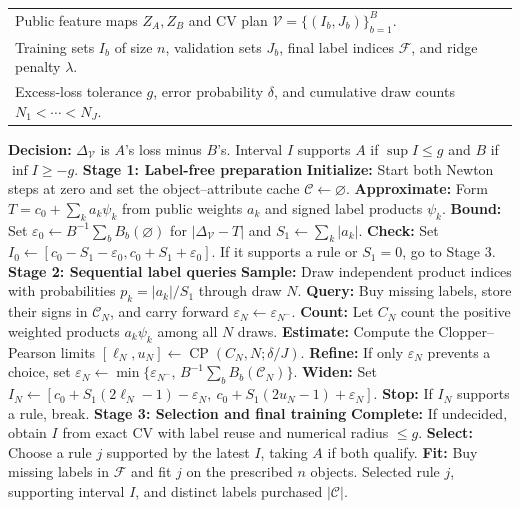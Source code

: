 \begin{algorithm}[H]
\caption{Label-Efficient Comparison (LEC) for a Fixed CV Plan}\label{alg:full}
\small
\renewcommand{\algorithmicrequire}{\textbf{Input:}}
\renewcommand{\algorithmicensure}{\textbf{Output:}}
\begin{algorithmic}[1]
\Require \begin{tabular}[t]{@{}l@{}}
Public feature maps $Z_A,Z_B$ and CV plan $\mathcal V=\{(I_b,J_b)\}_{b=1}^B$.\\
Training sets $I_b$ of size $n$, validation sets $J_b$, final label indices $\mathcal F$, and ridge penalty $\lambda$.\\
Excess-loss tolerance $g$, error probability $\delta$, and cumulative draw counts $N_1<\cdots<N_J$.
\end{tabular}
\Statex\textbf{Decision:} $\Delta_{\mathcal V}$ is $A$'s loss minus $B$'s. Interval $I$ supports $A$ if $\sup I\le g$ and $B$ if $\inf I\ge-g$.
\Statex\textbf{Stage 1: Label-free preparation}
\State \textbf{Initialize:} Start both Newton steps at zero and set the object--attribute cache $\mathcal C\gets\varnothing$.
\State \textbf{Approximate:} Form $T=c_0+\sum_k a_k\psi_k$ from public weights $a_k$ and signed label products $\psi_k$.
\State \textbf{Bound:} Set $\varepsilon_0\gets B^{-1}\sum_b B_b(\varnothing)$ for $|\Delta_{\mathcal V}-T|$ and $S_1\gets\sum_k|a_k|$.
\State \textbf{Check:} Set $I_0\gets[c_0-S_1-\varepsilon_0,c_0+S_1+\varepsilon_0]$. If it supports a rule or $S_1=0$, go to Stage 3.
\Statex\textbf{Stage 2: Sequential label queries}
  \State \textbf{Sample:} Draw independent product indices with probabilities $p_k=|a_k|/S_1$ through draw $N$.
  \State \textbf{Query:} Buy missing labels, store their signs in $\mathcal C_N$, and carry forward $\varepsilon_N\gets\varepsilon_{N^-}$.
  \State \textbf{Count:} Let $C_N$ count the positive weighted products $a_k\psi_k$ among all $N$ draws.
  \State \textbf{Estimate:} Compute the Clopper--Pearson limits $[\ell_N,u_N]\gets\operatorname{CP}(C_N,N;\delta/J)$.
  \State \textbf{Refine:} If only $\varepsilon_N$ prevents a choice, set $\varepsilon_N\gets\min\{\varepsilon_{N^-},\,B^{-1}\sum_b B_b(\mathcal C_N)\}$.
  \State \textbf{Widen:} Set $I_N\gets[c_0+S_1(2\ell_N-1)-\varepsilon_N,\ c_0+S_1(2u_N-1)+\varepsilon_N]$.
  \State \textbf{Stop:} If $I_N$ supports a rule, break.
\EndFor
\Statex\textbf{Stage 3: Selection and final training}
\State \textbf{Complete:} If undecided, obtain $I$ from exact CV with label reuse and numerical radius $\le g$.
\State \textbf{Select:} Choose a rule $j$ supported by the latest $I$, taking $A$ if both qualify.
\State \textbf{Fit:} Buy missing labels in $\mathcal F$ and fit $j$ on the prescribed $n$ objects.
\Ensure Selected rule $j$, supporting interval $I$, and distinct labels purchased $|\mathcal C|$.
\end{algorithmic}
\end{algorithm}
